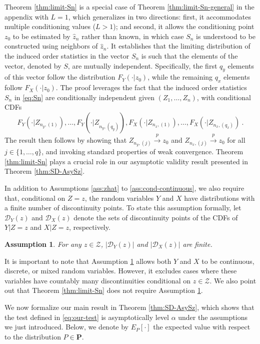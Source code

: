 \documentclass[11pt]{article}
\numberwithin{equation}{section}
\newtheorem{assumption}{Assumption}%
\begin{document}
Theorem \ref{thm:limit-Sn} is a special case of Theorem \ref{thm:limit-Sn-general} in the appendix with $L=1$, which generalizes \citet[][Theorem 4.1]{canay/kamat:18} in two directions: first, it accommodates multiple conditioning values ($L>1$); and second, it allows the conditioning point $z_0$ to be estimated by $\hat z_n$ rather than known, in which case $S_n$ is understood to be constructed using neighbors of $\hat z_n$. It establishes that the limiting distribution of the induced order statistics in the vector $S_n$ is such that the elements of the vector, denoted by $S$, are mutually independent. Specifically, the first $q_y$ elements of this vector follow the distribution $F_Y(\cdot|z_{0})$, while the remaining $q_x$ elements follow $F_X(\cdot|z_{0})$. The proof leverages the fact that the induced order statistics $S_n$ in \eqref{eq:Sn} are conditionally independent given $(Z_1,\dots,Z_n)$, with conditional CDFs $$F_Y(\cdot|{Z_{n_y,(1)}}),\dots,F_Y(\cdot|{Z_{n_y,(q_y)}}),F_X(\cdot|{Z_{n_x,(1)}}),\dots,F_X(\cdot|{Z_{n_x,(q_x)}})~.$$ The result then follows by showing that $Z_{n_y,(j)}\overset{p}{\to}z_0$ and $Z_{n_x,(j)}\overset{p}{\to}z_0$ for all $j\in\{1,\dots,q\}$, and invoking standard properties of weak convergence. Theorem \ref{thm:limit-Sn} plays a crucial role in our asymptotic validity result presented in Theorem \ref{thm:SD-AsySz}. 

In addition to Assumptions \ref{ass:zhat} to \ref{ass:cond-continuous}, we also require that, conditional on $Z=z$, the random variables $Y$ and $X$ have distributions with a finite number of discontinuity points. To state this assumption formally, let $\mathcal{D}_{Y}(z)$ and $\mathcal{D}_{X}(z)$ denote the sets of discontinuity points of the CDFs of ${ Y|Z=z }$ and ${ X|Z=z }$, respectively.

\begin{assumption}\label{ass:FiniteDisc}
For any $z \in \mathcal{Z}$, $|\mathcal{D}_{Y}(z)|$ and $|\mathcal{D}_{X}(z)|$ are finite.
\end{assumption}

It is important to note that Assumption \ref{ass:FiniteDisc} allows both $Y$ and $X$ to be continuous, discrete, or mixed random variables. However, it excludes cases where these variables have countably many discontinuities conditional on $z\in \mathcal Z$. We also point out that Theorem \ref{thm:limit-Sn} does not require Assumption \ref{ass:FiniteDisc}. 

We now formalize our main result in Theorem \ref{thm:SD-AsySz}, which shows that the test defined in \eqref{eq:our-test} is asymptotically level $\alpha$ under the assumptions we just introduced. Below, we denote by $E_P[\cdot]$ the expected value with respect to the distribution $P\in \mathbf P$.
\end{document}
